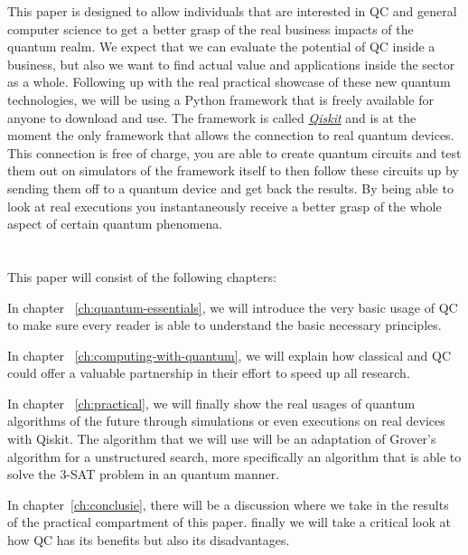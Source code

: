 This paper is designed to allow individuals that are interested in QC and general computer science  to get a better grasp of the real business impacts of the quantum realm. We expect that we can evaluate the potential of QC inside a business, but also we want to find actual value and applications inside the sector as a whole. Following up with the real practical showcase of these new quantum technologies, we will be using a Python framework that is freely available for anyone to download and use. The framework is called \href{https://qiskit.org/}{\textit{Qiskit}} and is at the moment the only framework that allows the connection to real quantum devices. This connection is free of charge,  you are able to create quantum circuits and test them out on simulators of the framework  itself to then follow these circuits up by sending them off to a quantum device and get back the results. By being able to look at real executions you instantaneously receive a better grasp of the whole aspect of certain quantum phenomena.

\section{}
\label{sec:opzet-bachelorproef}

This paper will consist of the following chapters:

In chapter ~\ref{ch:quantum-essentials}, we will introduce the very basic usage of QC to make sure every reader is able to understand the basic necessary principles.

In chapter ~\ref{ch:computing-with-quantum}, we will explain how classical and QC could offer a valuable partnership in their effort to speed up all research. 

In chapter ~\ref{ch:practical}, we will finally show the real usages of quantum algorithms of the future through simulations or even executions on real devices with Qiskit. The algorithm that we will use will be an adaptation of Grover's algorithm for a unstructured search, more specifically an algorithm that is able to solve the 3-SAT problem in an quantum manner.

In chapter~\ref{ch:conclusie}, there will be a discussion where we take in the results of the practical compartment of this paper. finally we will take a critical look at how QC has its benefits but also its disadvantages. 